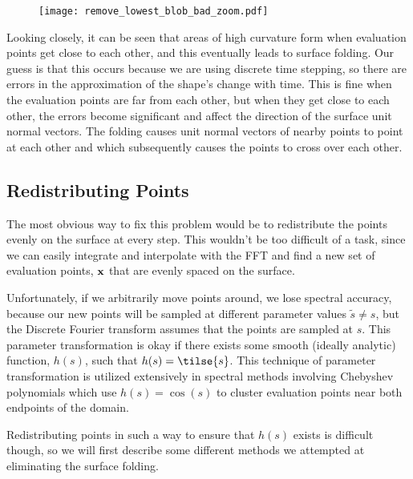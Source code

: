 \begin{figure}[H]
    \begin{center}
      \texttt{[image: remove\_lowest\_blob\_bad\_zoom.pdf]}
    \end{center}
  \vspace{-.2in} %
  \caption{\label{fig:remove-lowest-blog-bad-zoom}}
\end{figure}

Looking closely, it can be seen that areas of high curvature form when evaluation points get close to each other, and this eventually leads to surface folding. Our guess is that this occurs because we are using discrete time stepping, so there are errors in the approximation of the shape's change with time. This is fine when the evaluation points are far from each other, but when they get close to each other, the errors become significant and affect the direction of the surface unit normal vectors. The folding causes unit normal vectors of nearby points to point at each other and which subsequently causes the points to cross over each other.

\subsection*{Redistributing Points}

The most obvious way to fix this problem would be to redistribute the points evenly on the surface at every step. This wouldn't be too difficult of a task, since we can easily integrate and interpolate with the FFT and find a new set of evaluation points, $\mathbf{x}$ that are evenly spaced on the surface. 

Unfortunately, if we arbitrarily move points around, we lose spectral accuracy, because our new points will be sampled at different parameter values $\tilde{s} \ne s$, but the Discrete Fourier transform assumes that the points are sampled at $s$. This parameter transformation is okay if there exists some smooth (ideally analytic) function, $h(s)$, such that $h(s) = \tilse{s}$. This technique of parameter transformation is utilized extensively in spectral methods involving Chebyshev polynomials which use $h(s) = \cos(s)$ to cluster evaluation points near both endpoints of the domain.

Redistributing points in such a way to ensure that $h(s)$ exists is difficult though, so we will first describe some different methods we attempted at eliminating the surface folding.

